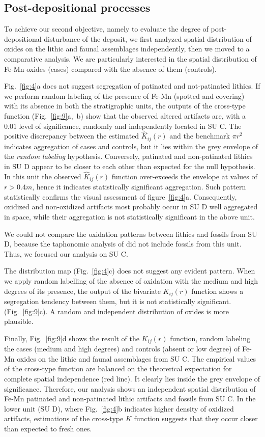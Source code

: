 \documentclass[review,authoryear]{elsarticle} %
\begin{document}
\subsection{Post-depositional processes}

To achieve our second objective, namely to evaluate the degree of post-depositional disturbance of the deposit, we first analyzed spatial distribution of oxides on the lithic and faunal assemblages independently, then we moved to a comparative analysis. We are particularly interested in the spatial distribution of Fe-Mn oxides (cases) compared with the absence of them (controls).

Fig.~\ref{fig:4}a does not suggest segregation of patinated and not-patinated lithics. If we perform random labeling of the presence of Fe-Mn (spotted and covering) with its absence in both the stratigraphic units, the outputs of the cross-type function (Fig.~\ref{fig:9}a,~b) show that the observed altered artifacts are, with a $0.01$ level of significance, randomly and independently located in SU C. The positive discrepancy between the estimated $\hat K_{ij}(r)$ and the benchmark $\pi r^2$ indicates aggregation of cases and controls, but it lies within the grey envelope of the \emph{random labeling} hypothesis. Conversely, patinated and non-patinated lithics in SU D appear to be closer to each other than expected for the null hypothesis. In this unit the observed $\hat K_{ij}(r)$ function over-exceeds the envelope at values of $r>0.4 m$, hence it indicates statistically significant aggregation. Such pattern statistically confirms the visual assessment of figure~\ref{fig:4}a. Consequently, oxidized and non-oxidized artifacts most probably occur in SU D well aggregated in space, while their aggregation is not statistically significant in the above unit.

We could not compare the oxidation patterns between lithics and fossils from SU D, because the taphonomic analysis of \citet{Bagnus2011} did not include fossils from this unit. Thus, we focused our analysis on SU C.

The distribution map (Fig.~\ref{fig:4}c) does not suggest any evident pattern. When we apply random labelling of the absence of oxidation with the medium and high degrees of its presence, the output of the bivariate $K_{ij}(r)$ function shows a segregation tendency between them, but it is not statistically significant. (Fig.~\ref{fig:9}c). A random and independent distribution of oxides is more plausible.

Finally, Fig.~\ref{fig:9}d shows the result of the $K_{ij}(r)$ function, random labeling the cases (medium and high degrees) and controls (absent or low degree) of Fe-Mn oxides on the lithic and faunal assemblages from SU C. The empirical values of the cross-type function are balanced on the theorerical expectation for complete spatial independence (red line). It clearly lies inside the grey envelope of significance. Therefore, our analysis shows an independent spatial distribution of Fe-Mn patinated and non-patinated lithic artifacts and fossils from SU C. In the lower unit (SU D), where Fig.~\ref{fig:4}b indicates higher density of oxidized artifacts, estimations of the cross-type $K$ function suggests that they occur closer than expected to fresh ones.
\end{document}
